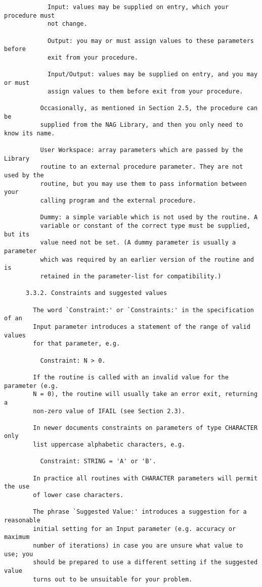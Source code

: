 \begin{small}
\begin{verbatim}
            Input: values may be supplied on entry, which your procedure must
            not change.

            Output: you may or must assign values to these parameters before
            exit from your procedure.

            Input/Output: values may be supplied on entry, and you may or must
            assign values to them before exit from your procedure.

          Occasionally, as mentioned in Section 2.5, the procedure can be
          supplied from the NAG Library, and then you only need to know its name.

          User Workspace: array parameters which are passed by the Library
          routine to an external procedure parameter. They are not used by the
          routine, but you may use them to pass information between your
          calling program and the external procedure.

          Dummy: a simple variable which is not used by the routine. A
          variable or constant of the correct type must be supplied, but its
          value need not be set. (A dummy parameter is usually a parameter
          which was required by an earlier version of the routine and is
          retained in the parameter-list for compatibility.)

      3.3.2. Constraints and suggested values

        The word `Constraint:' or `Constraints:' in the specification of an
        Input parameter introduces a statement of the range of valid values
        for that parameter, e.g.

          Constraint: N > 0.

        If the routine is called with an invalid value for the parameter (e.g.
        N = 0), the routine will usually take an error exit, returning a
        non-zero value of IFAIL (see Section 2.3).

        In newer documents constraints on parameters of type CHARACTER only
        list uppercase alphabetic characters, e.g.

          Constraint: STRING = 'A' or 'B'.

        In practice all routines with CHARACTER parameters will permit the use
        of lower case characters.

        The phrase `Suggested Value:' introduces a suggestion for a reasonable
        initial setting for an Input parameter (e.g. accuracy or maximum
        number of iterations) in case you are unsure what value to use; you
        should be prepared to use a different setting if the suggested value
        turns out to be unsuitable for your problem.


\end{verbatim}
\end{small}
